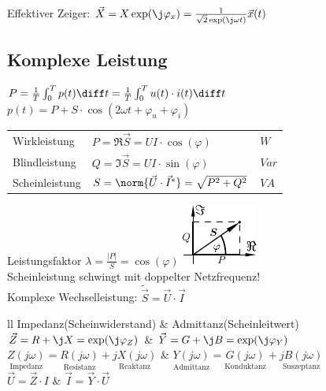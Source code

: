 \documentclass[european]{latex4ei_sheet}
\begin{document}
		Effektiver Zeiger: $\vec X = X \exp(\j \varphi_x) =\frac{1}{\sqrt{2} \exp(\j \omega t)}\vec x(t)$\\
		\subsection{Komplexe Leistung}
		$P = \frac1T \int_0^{T} p(t) \diff t = \frac1T \int_0^{T} u(t) \cdot i(t) \diff t$\\
		$p(t) = P + S \cdot \cos(2\omega t + \varphi_u + \varphi_i)$\\
		\begin{symbolbox}
			\begin{tabular}{lll}
				Wirkleistung & $P = \Re{\vec S} = U I \cdot \cos(\varphi)$ & $\si{W}$\\
				Blindleistung & $Q = \Im{\vec S} = U I \cdot \sin(\varphi)$ & $\si{Var}$\\
				Scheinleistung & $S = \norm{\vec U \cdot \vec I^*} = \sqrt{P^2 + Q^2}$ & $\si{VA}$\\
			\end{tabular}
		\end{symbolbox}
		Leistungsfaktor $\lambda = \frac{|P|}{S} = \cos(\varphi)$ \qquad
		\includegraphics[scale=1]{./img/leistung.pdf}\\
		
		Scheinleistung schwingt mit doppelter Netzfrequenz!\\
		Komplexe Wechselleistung: $\tilde {\vec S} = \vec U \cdot \vec I$\\

		\begin{tablebox}{ll}
		Impedanz(Scheinwiderstand) & Admittanz(Scheinleitwert)\\
		\mrule
		$\vec Z = R + \j X = \exp(\j \varphi_Z)$ & $\vec Y = G + \j B = \exp(\j \varphi_Y)$\\
		$\underset{\text{Impedanz}}{Z(j\omega)} = \underset{\text{Resistanz}}{R(j\omega)} + \underset{\text{Reaktanz}}{jX(j\omega)}$ & 	$\underset{\text{Admittanz}}{Y(j\omega)} = \underset{\text{Konduktanz}}{G(j\omega)} + \underset{\text{Suszeptanz}}{jB(j\omega)}$\\
		$\vec U = \vec Z \cdot I $ & $\vec I = \vec Y \cdot \vec U$\\

		\end{tablebox}
\end{document}
